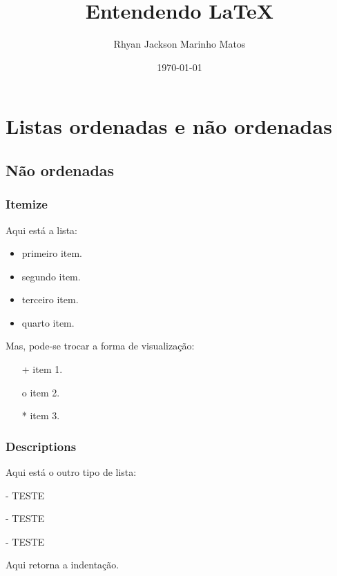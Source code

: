 \documentclass{report}
\title{\textbf{Entendendo \LaTeX}}
\author{Rhyan Jackson Marinho Matos}
\date{\today}
\begin{document}
    \maketitle
    \tableofcontents
    \part[Listas]{Listas ordenadas e não ordenadas}\label{part:listas}
    
    
    \chapter{Não ordenadas}\label{chap:nao-ordenadas}
            \section{Itemize}\label{sec:itemize}
                Aqui está a lista:
                \begin{itemize}\label{lista-itemize-exemplo}
                    \item primeiro item.
                    \item segundo item.
                    \item terceiro item.
                    \item quarto item.
                \end{itemize}
                Mas, pode-se trocar a forma de visualização:
                \begin{itemize}\label{lista-itemize-outravisu-exemplo}
                    \item[+] item 1.
                    \item[o] item 2.
                    \item[*] item 3.
                \end{itemize}
            \section{Descriptions}\label{sec:descriptions}
                Aqui está o outro tipo de lista:
                \begin{description}\label{lista-desc-exemplo}
                    \item[UA] - TESTE
                    \item[UB] - TESTE
                    \item[UC] - TESTE
                \end{description}
                Aqui retorna a indentação.
    
\end{document}
